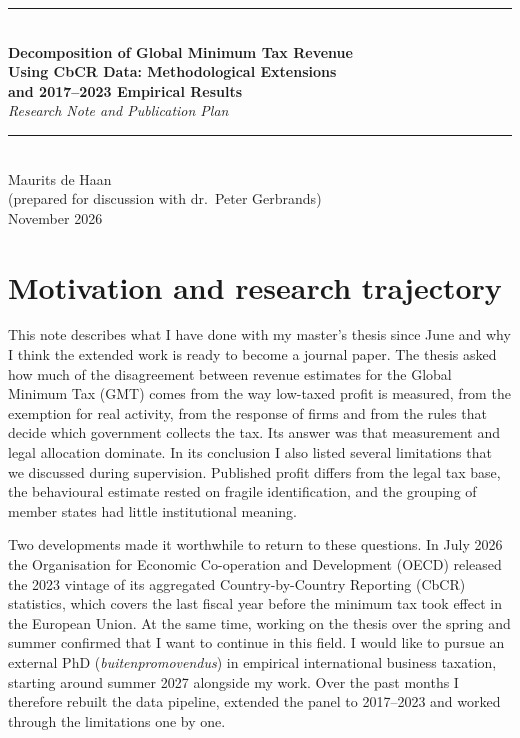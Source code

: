 \documentclass[11pt,a4paper]{article}
\newcommand{\thesisdivider}{\vspace{0.3em}\noindent\rule{\textwidth}{0.65pt}\vspace{0.35em}}
\begin{document}
\thispagestyle{plain}
\begin{center}
  \thesisdivider\\
  {\Large\bfseries Decomposition of Global Minimum Tax Revenue\\[0.1em]
  Using CbCR Data: Methodological Extensions\\[0.1em]
  and 2017–2023 Empirical Results}\\[0.5em]
  {\large\itshape Research Note and Publication Plan}\\[0.3em]
  \thesisdivider\\[0.2em]
  {\large Maurits de Haan}\\[0.15em]
  {\small (prepared for discussion with dr.\ Peter Gerbrands)}\\[0.3em]
  {\small November 2026}
\end{center}
\vspace{-0.6em}

\section{Motivation and research trajectory}

This note describes what I have done with my master's thesis since June and why I think the extended work is ready to become a journal paper. The thesis asked how much of the disagreement between revenue estimates for the Global Minimum Tax (GMT) comes from the way low-taxed profit is measured, from the exemption for real activity, from the response of firms and from the rules that decide which government collects the tax. Its answer was that measurement and legal allocation dominate. In its conclusion I also listed several limitations that we discussed during supervision. Published profit differs from the legal tax base, the behavioural estimate rested on fragile identification, and the grouping of member states had little institutional meaning.

Two developments made it worthwhile to return to these questions. In July 2026 the Organisation for Economic Co-operation and Development (OECD) released the 2023 vintage of its aggregated Country-by-Country Reporting (CbCR) statistics, which covers the last fiscal year before the minimum tax took effect in the European Union. At the same time, working on the thesis over the spring and summer confirmed that I want to continue in this field. I would like to pursue an external PhD (\emph{buitenpromovendus}) in empirical international business taxation, starting around summer 2027 alongside my work. Over the past months I therefore rebuilt the data pipeline, extended the panel to 2017–2023 and worked through the limitations one by one.
\end{document}

